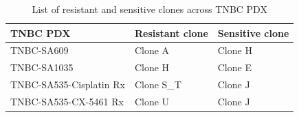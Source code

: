  \begin{table}[htbp]
   
   \centering
   \caption{List of resistant and sensitive clones across TNBC PDX}
     \begin{tabular}{|l|l|l|}
      \hline
     TNBC PDX & Resistant clone & Sensitive clone \\
     \hline
     TNBC-SA609  & Clone A & Clone H \\
     TNBC-SA1035 & Clone H & Clone E \\
     TNBC-SA535-Cisplatin Rx & Clone S\_T & Clone J \\
     TNBC-SA535-CX-5461 Rx & Clone U & Clone J \\  
     \hline
     \end{tabular}%
   \label{tab:Listofresistantandsensitiveclones}%
   
 \end{table}%

